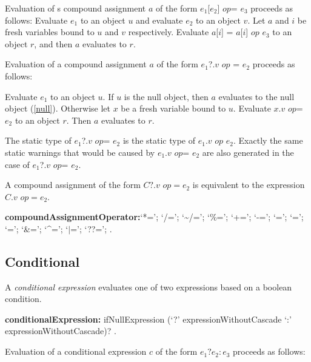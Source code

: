 \documentclass{article}
\newcommand{\code}[1]{{\sf #1}}
\begin{document}
\LMHash{}
Evaluation of s compound assignment $a$ of the form \code{$e_1$[$e_2$] $op$= $e_3$} proceeds as follows:
Evaluate $e_1$ to an object $u$ and evaluate $e_2$ to an object $v$.
Let $a$ and $i$ be fresh variables bound to $u$ and $v$ respectively.
Evaluate \code{$a$[$i$] = $a$[$i$] $op$ $e_3$} to an object $r$,
and then $a$ evaluates to $r$.

\LMHash{}
Evaluation of a compound assignment $a$ of the form \code{$e_1$?.$v$ $op$ = $e_2$} proceeds as follows:

\LMHash{}
Evaluate $e_1$ to an object $u$.
If $u$ is the null object, then $a$ evaluates to the null object (\ref{null}).
Otherwise let $x$ be a fresh variable bound to $u$.
Evaluate \code{$x$.$v$ $op$= $e_2$} to an object $r$.
Then $a$ evaluates to $r$.

\LMHash{}
The static type of \code{$e_1$?.$v$ $op$= $e_2$} is the static type of \code{$e_1$.$v$ $op$ $e_2$}. Exactly the same static warnings that would be caused by \code{$e_1$.$v$ $op$= $e_2$} are also generated in the case of \code{$e_1$?.$v$ $op$= $e_2$}.

\LMHash{}
A compound assignment of the form $C?.v$ $op = e_2$ is equivalent to the expression
$C.v$ $op = e_2$.

\begin{grammar}
{\bf compoundAssignmentOperator:}`*=';
      `/=';
      `\~{}/=';
      `\%=';
      `+=';
      `-=';
      `{\escapegrammar \lt \lt}=';
      `{\escapegrammar \gt \gt}=';
      `{\escapegrammar \gt \gt \gt}=';
      `\&=';
      `\^{}=';
      `$|$=';
      `??=';
    .
\end{grammar}


\subsection{ Conditional}

\LMHash{}
A {\em conditional expression} evaluates one of two expressions based on a boolean condition.

\begin{grammar}
  {\bf conditionalExpression:}
     ifNullExpression (`?' expressionWithoutCascade `{\escapegrammar :}' expressionWithoutCascade)?
    . %
\end{grammar}

\LMHash{}
Evaluation of a conditional expression $c$ of the form $e_1 ? e_2 : e_3$ proceeds as follows:
\end{document}
